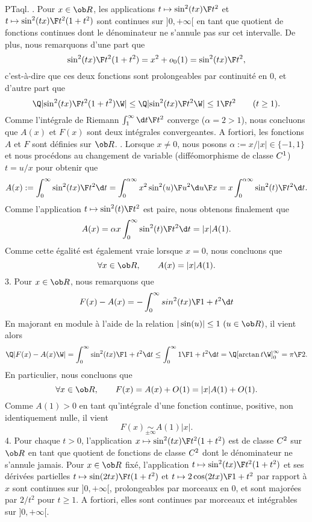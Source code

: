 \sol PTaql. 
. Pour $x\in\ob R$, les applications $t\mapsto{\sin^2(tx)\F t^2}$ et $t\mapsto{\sin^2(tx)\F t^2(1+t^2)}$ sont continues sur $]0, +\infty[$ en tant que quotient de fonctions continues dont le dénominateur ne s'annule pas sur cet intervalle. De plus, nous remarquons d'une part que 
$$
{\sin^2(tx)\F t^2(1+t^2)} = x^2 +o_0(1) = {\sin^2(tx)\F t^2}, 
$$
c'est-à-dire que ces deux fonctions sont prolongeables par continuité en $0$, et d'autre part que 
$$
\Q|{\sin^2(tx)\F t^2(1+t^2)}\W| \le \Q|{\sin^2(tx)\F t^2}\W| \le {1\F t^2} \qquad (t\ge1).
$$
Comme l'intégrale de Riemann $\int_1^\infty{\d t\F t^2}$ converge ($\alpha = 2>1$), nous concluons que $A(x)$ et $F(x)$ sont deux intégrales convergeantes. A fortiori, les fonctions $A$ et $F$ sont définies sur $\ob R$.  
\medskip{}. Lorsque $x\neq 0$, nous posons $\alpha := x/|x| \in\{-1, 1\}$ et nous procédons au changement de variable (difféomorphisme de classe $\sc C^1$) $t=u/x$ pour obtenir que 
$$
A(x):=\int_0^\infty{\sin^2(tx)\F t^2}\d t=\int_0^{\alpha\infty}{x^2\sin^2(u)\F u^2}{\d u\F x} = x\int_0^{\alpha\infty}{\sin^2(t)\F t^2}\d t.
$$
Comme l'application $t\mapsto {\sin^2(t)\F t^2}$ est paire, nous obtenons finalement que 
$$
A(x)= \alpha x \int_0^\infty{\sin^2(t)\F t^2}\d t = |x| A(1).
$$
Comme cette égalité est également vraie lorsque $x=0$, nous concluons que
$$
\forall x\in\ob R, \qquad A(x)=|x| A(1).
$$
3. Pour $x\in\ob R$, nous remarquons que 
$$
F(x)-A(x) = -\int_0^\infty{sin^2(tx)\F 1+ t^2}\d t
$$
En majorant en module à l'aide de la relation $|\sin(u)|\le 1\ (u\in\ob R)$, il vient alors
$$
\Q|F(x)-A(x)\W| =  \int_0^\infty {\sin^2(tx)\F 1+ t^2}\d t \le  \int_0^\infty {1\F 1+ t^2}\d t= \Q[\arctan t\W]_0^\infty = {\pi\F2}.  
$$
En particulier, nous concluons que 
$$
\forall x\in \ob R, \qquad F(x)=A(x) + O(1) = |x|A(1) + O(1).
$$
Comme $A(1)>0$ en tant qu'intégrale d'une fonction continue, positive, non identiquement nulle, il vient
$$
F(x) \mathop\sim\limits_{\pm\infty} A(1)|x|.
$$
4. Pour chaque $t>0$, l'application $x\mapsto {\sin^2(tx)\F t^2(1+t^2)}$ est de classe $\sc C^2$ sur $\ob R$ en tant que quotient de fonctions de classe $\sc C^2$ dont le dénominateur ne s'annule jamais. \PAR\noindent
Pour $x\in\ob R$ fixé, l'application $t\mapsto{\sin^2(tx)\F t^2(1+t^2)}$ et ses dérivées partielles  $t\mapsto {\sin(2tx)\F t(1+t^2)}$ et $t\mapsto {2\cos(2tx)\F 1+t^2}$ par rapport à $x$ sont continues sur $]0,+\infty[$, prolongeables par morceaux en $0$, et sont majorées par $2/t^2$ pour $t\ge1$. A fortiori, elles sont continues par morceaux et intégrables sur $]0,+\infty[$. 
